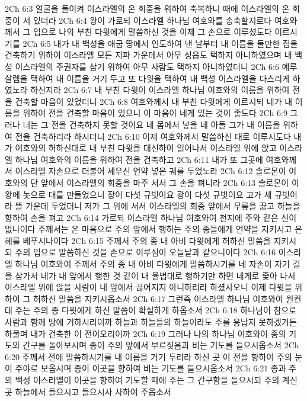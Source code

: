2Ch 6:3  얼굴을 돌이켜 이스라엘의 온 회중을 위하여 축복하니 때에 이스라엘의 온 회중이 서 있더라
2Ch 6:4  왕이 가로되 이스라엘 하나님 여호와를 송축할지로다 여호와께서 그 입으로 나의 부친 다윗에게 말씀하신 것을 이제 그 손으로 이루셨도다 이르시기를
2Ch 6:5  내가 내 백성을 애굽 땅에서 인도하여 낸 날부터 내 이름을 둘만한 집을 건축하기 위하여 이스라엘 모든 지파 가운데서 아무 성읍도 택하지 아니하였으며 내 백성 이스라엘의 주권자를 삼기 위하여 아무 사람도 택하지 아니하였더니
2Ch 6:6  예루살렘을 택하여 내 이름을 거기 두고 또 다윗을 택하여 내 백성 이스라엘을 다스리게 하였노라 하신지라
2Ch 6:7  내 부친 다윗이 이스라엘 하나님 여호와의 이름을 위하여 전을 건축할 마음이 있었더니
2Ch 6:8  여호와께서 내 부친 다윗에게 이르시되 네가 내 이름을 위하여 전을 건축할 마음이 있으니 이 마음이 네게 있는 것이 좋도다
2Ch 6:9  그러나 너는 그 전을 건축하지 못할 것이요 네 몸에서 낳을 네 아들 그가 내 이름을 위하여 전을 건축하리라 하시더니
2Ch 6:10  이제 여호와께서 말씀하신 대로 이루시도다 내가 여호와의 허하신대로 내 부친 다윗을 대신하여 일어나서 이스라엘 위에 앉고 이스라엘 하나님 여호와의 이름을 위하여 전을 건축하고
2Ch 6:11  내가 또 그곳에 여호와께서 이스라엘 자손으로 더불어 세우신 언약 넣은 궤를 두었노라
2Ch 6:12  솔로몬이 여호와의 단 앞에서 이스라엘의 회중을 마주 서서 그 손을 펴니라
2Ch 6:13  솔로몬이 이왕에 놋으로 대를 만들었으니 장이 다섯 규빗이요 광이 다섯 규빗이요 고가 세 규빗이라 뜰 가운데 두었더니 저가 그 위에 서서 이스라엘의 회중 앞에서 무릎을 끓고 하늘을 향하여 손을 펴고
2Ch 6:14  가로되 이스라엘 하나님 여호와여 천지에 주와 같은 신이 없나이다 주께서는 온 마음으로 주의 앞에서 행하는 주의 종들에게 언약을 지키시고 은혜를 베푸시나이다
2Ch 6:15  주께서 주의 종 내 아비 다윗에게 허하신 말씀을 지키시되 주의 입으로 말씀하신 것을 손으로 이루심이 오늘날과 같으니이다
2Ch 6:16  이스라엘 하나님 여호와여 주께서 주의 종 내 아비 다윗에게 말씀하시기를 네 자손이 자기 길을 삼가서 네가 내 앞에서 행한 것 같이 내 율법대로 행하기만 하면 네게로 좇아 나서 이스라엘 위에 앉을 사람이 내 앞에서 끊어지지 아니하리라 하셨사오니 이제 다윗을 위하여 그 허하신 말씀을 지키시옵소서
2Ch 6:17  그런즉 이스라엘 하나님 여호와여 원컨대 주는 주의 종 다윗에게 하신 말씀이 확실하게 하옵소서
2Ch 6:18  하나님이 참으로 사람과 함께 땅에 거하시리이까 하늘과 하늘들의 하늘이라도 주를 용납지 못하겠거든 하물며 내가 건축한 이 전이오리이까
2Ch 6:19  그러나 나의 하나님 여호와여 종의 기도와 간구를 돌아보시며 종이 주의 앞에서 부르짖음과 비는 기도를 들으시옵소서
2Ch 6:20  주께서 전에 말씀하시기를 내 이름을 거기 두리라 하신 곳 이 전을 향하여 주의 눈이 주야로 보옵시며 종이 이곳을 향하여 비는 기도를 들으시옵소서
2Ch 6:21  종과 주의 백성 이스라엘이 이곳을 향하여 기도할 때에 주는 그 간구함을 들으시되 주의 계신 곳 하늘에서 들으시고 들으시사 사하여 주옵소서
